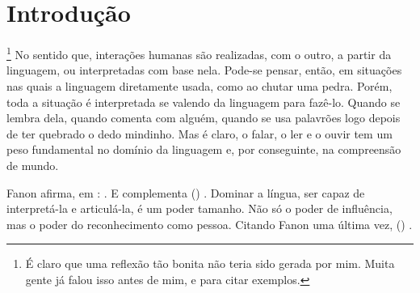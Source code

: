 \chapter{Introdução}
\label{cha:introducao}
 \cite{oliveira2019servico}
\footnote{É claro que uma reflexão tão bonita não teria sido gerada por mim. Muita gente já falou isso antes de mim,  e  para citar exemplos.}
No sentido que, interações humanas são realizadas, com o outro, a partir da linguagem, ou interpretadas com base nela. 
Pode-se pensar, então, em situações nas quais a linguagem  diretamente usada, como ao chutar uma pedra.
Porém, toda a situação é interpretada se valendo da linguagem para fazê-lo. 
Quando se lembra dela, quando comenta com alguém, quando se  usa palavrões logo depois de ter quebrado o dedo mindinho. Mas é claro, o falar, o ler e o ouvir tem um peso fundamental no domínio da linguagem e, por conseguinte, na compreensão de mundo.

Fanon afirma, em : . E complementa (\textit{}) . Dominar a língua, ser capaz de interpretá-la e articulá-la, é um poder tamanho. Não só o poder de influência, mas o poder do reconhecimento como pessoa. Citando Fanon uma última vez, (\textit{}) .

